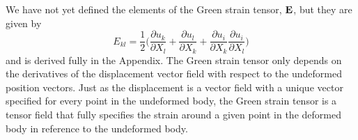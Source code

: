 We have not yet defined the elements of the Green strain tensor, ${\bf{E}}$, but they are given by 
\begin{equation}
\label{eq:gst}
 E_{kl}=\frac{1}{2}\bigg(\frac{\partial u_k}{\partial X_l}  + \frac{\partial u_l}{\partial X_k} +
  \frac{\partial u_i}{\partial X_k}\frac{\partial u_i}{\partial X_l}\bigg)
\end{equation}
and is derived fully in the Appendix.  
The Green strain tensor only depends on the derivatives of the displacement vector field with respect to the 
undeformed position vectors. Just as the displacement is a vector field with a unique vector specified for every point in the undeformed body, the Green strain tensor 
is a tensor field that fully specifies the strain around a given point in the deformed body in reference to the undeformed body.  

